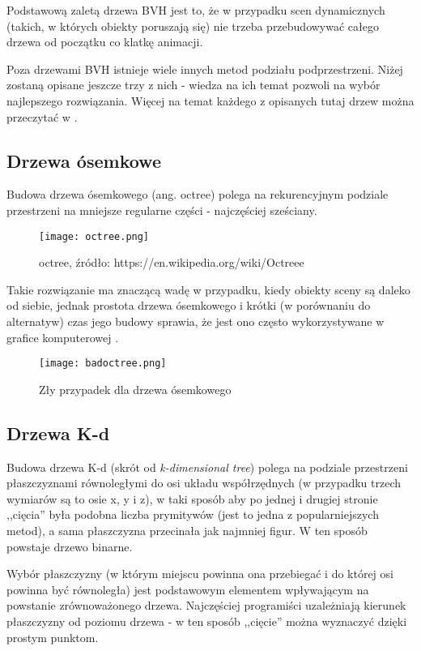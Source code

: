 Podstawową zaletą drzewa BVH jest to, że w przypadku scen dynamicznych (takich, w których obiekty poruszają się) nie trzeba przebudowywać całego drzewa od początku co klatkę animacji.


Poza drzewami BVH istnieje wiele innych metod podziału podprzestrzeni. Niżej zostaną opisane jeszcze trzy z nich - wiedza na ich temat pozwoli na wybór najlepszego rozwiązania. Więcej na temat każdego z opisanych tutaj drzew można przeczytać w \cite{trees, dunn02}.

\subsection{Drzewa ósemkowe}

Budowa drzewa ósemkowego (ang. octree) polega na rekurencyjnym podziale przestrzeni na mniejsze regularne części - najczęściej sześciany.

\begin{figure}[h!]
\centering
  \caption{octree, źródło: https://en.wikipedia.org/wiki/Octreee}
  \texttt{[image: octree.png]}
\end{figure}

Takie rozwiązanie ma znaczącą wadę w przypadku, kiedy obiekty sceny są daleko od siebie, jednak prostota drzewa ósemkowego i krótki (w porównaniu do alternatyw) czas jego budowy sprawia, że jest ono często wykorzystywane w grafice komputerowej \cite{octree1, octree2}.

\begin{figure}[h!]
\centering
  \caption{Zły przypadek dla drzewa ósemkowego}
  \texttt{[image: badoctree.png]}
\end{figure}

\subsection{Drzewa K-d}

Budowa drzewa K-d (skrót od \emph{k-dimensional tree}) polega na podziale przestrzeni płaszczyznami równoległymi do osi układu współrzędnych (w przypadku trzech wymiarów są to osie x, y i z), w taki sposób aby po jednej i drugiej stronie ,,cięcia'' była podobna liczba prymitywów (jest to jedna z popularniejszych metod), a sama płaszczyzna przecinała jak najmniej figur. W ten sposób powstaje drzewo binarne.

Wybór płaszczyzny (w którym miejscu powinna ona przebiegać i do której osi powinna być równoległa) jest podstawowym elementem wpływającym na powstanie zrównoważonego drzewa. Najczęściej programiści uzależniają kierunek płaszczyzny od poziomu drzewa - w ten sposób ,,cięcie'' można wyznaczyć dzięki prostym punktom.

